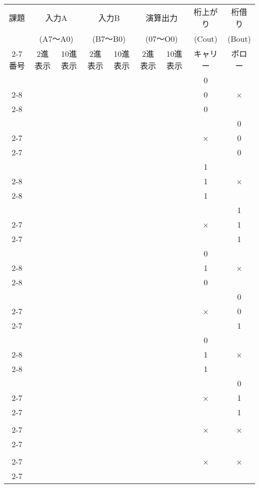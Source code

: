 \documentclass[11pt,a4j]{jsarticle}
\begin{document}
  \begin{table}[htb]
  \begin{center}
    \caption{}
    \begin{tabular}{|c|c|c|c|c|c|c|c|c|} \hline
課題 & \multicolumn{2}{|c|}{入力A} & \multicolumn{2}{|c|}{入力B} & \multicolumn{2}{|c|}{演算出力} & 桁上がり & 桁借り\\
 & \multicolumn{2}{|c|}{(A7～A0)} & \multicolumn{2}{|c|}{(B7～B0)} & \multicolumn{2}{|c|}{(07～O0)} & (Cout) & (Bout) \\ \cline{2-7}
番号 & 2進表示 & 10進表示 & 2進表示 & 10進表示 & 2進表示 & 10進表示 & キャリー & ボロー \\ \hline
 &  &  &  &  &  &  & 0 &  \\ \cline{2-8}
 &  &  &  &  &  &  & 0 & × \\ \cline{2-8}
 &  &  &  &  &  &  & 0 &  \\ \hline
 &  &  &  &  &  &  &  & 0 \\ \cline{2-7}\cline{9-9}
 &  &  &  &  &  &  & × & 0 \\ \cline{2-7}\cline{9-9}
 &  &  &  &  &  &  &  & 0 \\ \hline
 &  &  &  &  &  &  & 1 &  \\ \cline{2-8}
 &  &  &  &  &  &  & 1 & × \\ \cline{2-8}
 &  &  &  &  &  &  & 1 &  \\ \hline
 &  &  &  &  &  &  &  & 1 \\ \cline{2-7}\cline{9-9}
 &  &  &  &  &  &  & × & 1 \\ \cline{2-7}\cline{9-9}
 &  &  &  &  &  &  &  & 1 \\ \hline
 &  &  &  &  &  &  & 0 &  \\ \cline{2-8}
 &  &  &  &  &  &  & 1 & × \\ \cline{2-8}
 &  &  &  &  &  &  & 0 &  \\ \hline
 &  &  &  &  &  &  &  & 0 \\ \cline{2-7}\cline{9-9}
 &  &  &  &  &  &  & × & 0 \\ \cline{2-7}\cline{9-9}
 &  &  &  &  &  &  &  & 1 \\ \hline
 &  &  &  &  &  &  & 0 &  \\ \cline{2-8}
 &  &  &  &  &  &  & 1 & × \\ \cline{2-8}
 &  &  &  &  &  &  & 1 &  \\ \hline
 &  &  &  &  &  &  &  & 0 \\ \cline{2-7}\cline{9-9}
 &  &  &  &  &  &  & × & 1 \\ \cline{2-7}\cline{9-9}
 &  &  &  &  &  &  &  & 1 \\ \hline
 &  &  &  &  &  &  &  &  \\ \cline{2-7}
 &  &  &  &  &  &  & × & × \\ \cline{2-7}
 &  &  &  &  &  &  &  &  \\ \hline
 &  &  &  &  &  &  &  &  \\ \cline{2-7}
 &  &  &  &  &  &  & × & × \\ \cline{2-7}
 &  &  &  &  &  &  &  &  \\ \hline
    \end{tabular}
    \label{}
  \end{center}
 \end{table}
 
\end{document}
